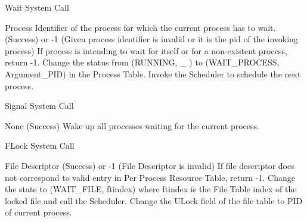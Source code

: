 
\begin{algorithm}
\caption{Wait System Call}
\begin{algorithmic}
\REQUIRE Process Identifier of the process for which the current process has to wait.
 (Success) or -1 (Given process identifier is invalid or it is the pid of the invoking process)
\STATE If process is intending to wait for itself or for a non-existent process, return -1.    
\STATE Change the status from (RUNNING, \_ ) to (WAIT\_PROCESS, Argument\_PID) in the Process Table.
\STATE Invoke the Scheduler to schedule the next process.
\end{algorithmic}
\end{algorithm}


\begin{algorithm}
\caption{Signal System Call}
\begin{algorithmic}
\REQUIRE None
 (Success) 
\STATE Wake up all processes waiting for the current process.
\end{algorithmic}
\end{algorithm}


\begin{algorithm}
\caption{FLock System Call}
\begin{algorithmic}
\REQUIRE File Descriptor
 (Success) or -1 (File Descriptor is invalid)
\STATE If file descriptor does not correspond to valid entry in Per Process Resource Table, return -1.
    \STATE Change the state to (WAIT\_FILE, ftindex) where ftindex is the File Table index of the locked file and call the Scheduler.
\ENDWHILE
\STATE Change the ULock field of the file table to PID of current process.     
\end{algorithmic}
\end{algorithm}

